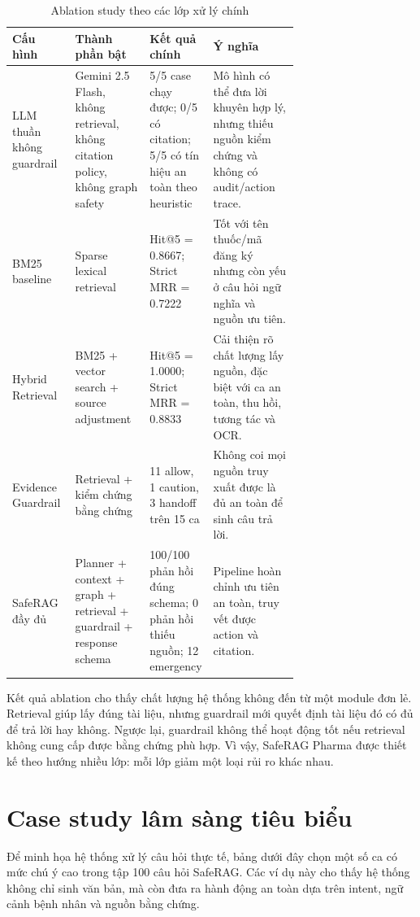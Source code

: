 \begin{table}[H]
\centering
\small
\caption{Ablation study theo các lớp xử lý chính}
\begin{tabularx}{\linewidth}{L{0.22\linewidth} L{0.26\linewidth} L{0.22\linewidth} Y}
\toprule
\textbf{Cấu hình} & \textbf{Thành phần bật} & \textbf{Kết quả chính} & \textbf{Ý nghĩa} \\
\midrule
LLM thuần không guardrail & Gemini 2.5 Flash, không retrieval, không citation policy, không graph safety & 5/5 case chạy được; 0/5 có citation; 5/5 có tín hiệu an toàn theo heuristic & Mô hình có thể đưa lời khuyên hợp lý, nhưng thiếu nguồn kiểm chứng và không có audit/action trace. \\
BM25 baseline & Sparse lexical retrieval & Hit@5 = 0.8667; Strict MRR = 0.7222 & Tốt với tên thuốc/mã đăng ký nhưng còn yếu ở câu hỏi ngữ nghĩa và nguồn ưu tiên. \\
Hybrid Retrieval & BM25 + vector search + source adjustment & Hit@5 = 1.0000; Strict MRR = 0.8833 & Cải thiện rõ chất lượng lấy nguồn, đặc biệt với ca an toàn, thu hồi, tương tác và OCR. \\
Evidence Guardrail & Retrieval + kiểm chứng bằng chứng & 11 allow, 1 caution, 3 handoff trên 15 ca & Không coi mọi nguồn truy xuất được là đủ an toàn để sinh câu trả lời. \\
SafeRAG đầy đủ & Planner + context + graph + retrieval + guardrail + response schema & 100/100 phản hồi đúng schema; 0 phản hồi thiếu nguồn; 12 emergency & Pipeline hoàn chỉnh ưu tiên an toàn, truy vết được action và citation. \\
\bottomrule
\end{tabularx}
\end{table}

Kết quả ablation cho thấy chất lượng hệ thống không đến từ một module đơn lẻ. Retrieval giúp lấy đúng tài liệu, nhưng guardrail mới quyết định tài liệu đó có đủ để trả lời hay không. Ngược lại, guardrail không thể hoạt động tốt nếu retrieval không cung cấp được bằng chứng phù hợp. Vì vậy, SafeRAG Pharma được thiết kế theo hướng nhiều lớp: mỗi lớp giảm một loại rủi ro khác nhau.

\section{Case study lâm sàng tiêu biểu}

Để minh họa hệ thống xử lý câu hỏi thực tế, bảng dưới đây chọn một số ca có mức chú ý cao trong tập 100 câu hỏi SafeRAG. Các ví dụ này cho thấy hệ thống không chỉ sinh văn bản, mà còn đưa ra hành động an toàn dựa trên intent, ngữ cảnh bệnh nhân và nguồn bằng chứng.

